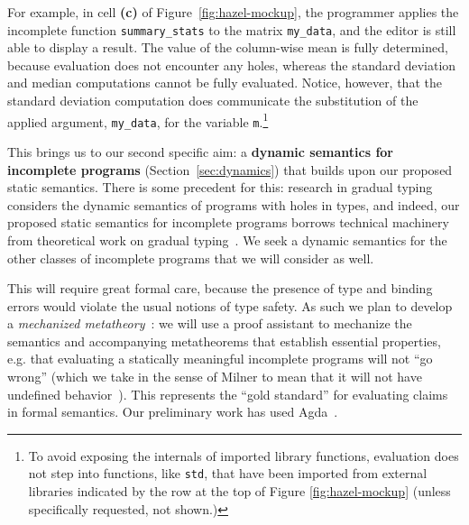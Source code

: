 \documentclass[letterpaper,USenglish]{lipics-v2016}
\let\li\lstinline
\begin{document}
For example, in cell \textbf{(c)} of Figure~\ref{fig:hazel-mockup}, the
programmer applies  the incomplete function \li{summary_stats} to 
the matrix \lstinline{my_data}, and 
the editor is still able to display a result.
The value of the column-wise mean is fully determined, because evaluation does
not encounter any holes, whereas the standard deviation and median computations
cannot be fully evaluated. Notice, however, that the standard
deviation computation does communicate the substitution of the applied argument,
\li{my_data}, for the variable \li{m}.\footnote{To avoid exposing the internals
of imported library functions, evaluation does not step into functions, like
\li{std}, that have been imported from external libraries indicated by the row at the top of Figure \ref{fig:hazel-mockup} (unless specifically
requested, not shown.)}

This brings us to our second specific aim: a
\textbf{dynamic semantics for incomplete programs} (Section~\ref{sec:dynamics}) that builds upon our proposed
static semantics. There is some precedent for this: research in gradual typing
considers the dynamic semantics of programs with holes in types, and indeed, our
proposed static semantics for incomplete programs borrows technical machinery
from theoretical work on gradual typing~\cite{Siek06a}. We seek a dynamic semantics for the
other classes of incomplete programs that we will consider as well.

This will require great formal care, because the presence of type
and binding errors would violate the usual notions of type safety. As such we plan to develop a \emph{mechanized
  metatheory}~\cite{Lee:2007:TMM:1190216.1190245}: we will use a proof assistant to mechanize the semantics and
accompanying metatheorems that establish essential properties, e.g. that
evaluating a statically meaningful incomplete programs will not ``go wrong'' (which we take in
the sense of Milner to mean that it will not have undefined behavior~\cite{milner1978theory,pfpl}).
This represents the ``gold standard'' for evaluating claims in formal
semantics.  Our preliminary work has used Agda~\cite{norell2009dependently}.
\end{document}

